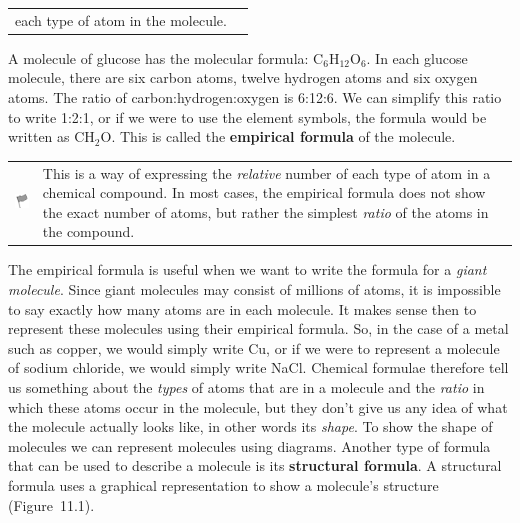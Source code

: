 \begin{enumerate}[noitemsep, label=\textbf{\arabic*}. ]
\begin{definition}
\begin{tabular*}{15 cm}{m{15 mm}m{}}
{each type of atom in the molecule. 
 } 
      \end{tabular*}
      \end{definition}
A molecule of glucose has the molecular formula:
\begin{math}{\mathrm{C}}_{6}{\mathrm{H}}_{12}{\mathrm{O}}_{6}\end{math}.
In each glucose molecule, there are six carbon atoms, twelve hydrogen atoms and 
six oxygen atoms. The ratio of carbon:hydrogen:oxygen is 6:12:6. We can simplify 
this ratio to write 1:2:1, or if we were to use the element symbols, the formula 
would be written as \begin{math}{\mathrm{CH}}_{2}\mathrm{O}\end{math}. This is called the \textbf{empirical formula} of the molecule.
\vspace{\rubberspace}\par
        \label{m38120*fhsst!!!underscore!!!id93}\begin{definition}
	  \begin{tabular*}{15 cm}{m{15 mm}m{}}
	\hspace*{-50pt}  \includegraphics[width=0.5in]{col11305.imgs/psflag2.png}   & \Definition{   \label{id2456770}\textbf{ Empirical formula }} { \label{m38120*meaningfhsst!!!underscore!!!id93}
This is a way of expressing the \textsl{relative} 
number of each type of atom in a chemical compound. In most cases, the empirical 
formula does not show the exact number of atoms, but rather the simplest 
\textsl{ratio} of the atoms in the compound. 
 } 
      \end{tabular*}
      \end{definition}
The empirical formula is useful when we want to write the 
formula for a \textsl{giant molecule}. Since giant 
molecules may consist of millions of atoms, it is impossible to say exactly how 
many atoms are in each molecule. It makes sense then to represent these 
molecules using their empirical formula. So, in the case of a metal such as 
copper, we would simply write Cu, or if we were to represent a molecule of 
sodium chloride, we would simply write NaCl.
Chemical formulae therefore tell us something about the \textsl{types} of atoms that are in a molecule and the 
\textsl{ratio} in which these atoms occur in the 
molecule, but they don't give us any idea of what the molecule actually looks 
like, in other words its \textsl{shape}. To show 
the shape of molecules we can represent molecules using diagrams.
Another type of formula that can be used to describe a molecule is its \textbf{structural formula}. A structural formula uses a 
graphical representation to show a molecule's structure                    
(Figure~11.1).


\end{enumerate}
